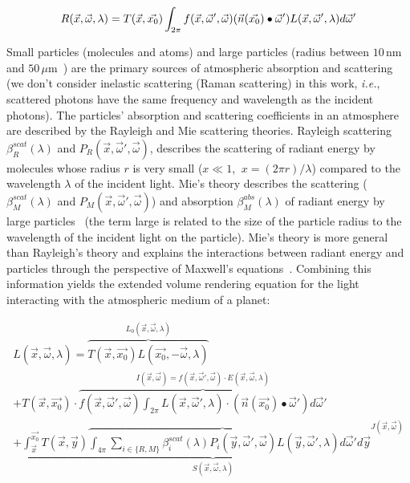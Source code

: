 \documentclass[journal]{vgtc}                %
\begin{document}
\begin{equation}\label{eq:reflected_light}
\small
R(\vec{x}, \vec{\omega}, \lambda) = T(\vec{x}, \vec{x_0}) \int_{2\pi}{ f(\vec{x}, \vec{\omega}', \vec{\omega})(\vec{n}(\vec{x_0}) \bullet  \vec{\omega}') L(\vec{x},\vec{\omega}', \lambda)d\vec{\omega}'}
\end{equation}

Small particles (molecules and atoms) and large particles (radius between $10\,\text{nm}$ and $50\,\mu \text{m}$~\cite{Thomas:2017}) are the primary sources of atmospheric absorption and scattering (we don't consider inelastic scattering (Raman scattering) in this work, \textit{i.e.}, scattered photons have the same frequency and wavelength as the incident photons). The particles' absorption and scattering coefficients in an atmosphere are described by the Rayleigh and Mie scattering theories. Rayleigh scattering~\cite{Rayleigh:1871} $\beta_R^{scat}(\lambda)$ and $P_R(\vec{x}, \vec{\omega}', \vec{\omega})$, describes the scattering of radiant energy by molecules whose radius $r$ is very small ($x \ll 1$, $\ x=(2\pi r)/\lambda$) compared to the wavelength $\lambda$ of the incident light. Mie's theory describes the scattering ($\beta_M^{scat}(\lambda)$ and $P_M(\vec{x}, \vec{\omega}', \vec{\omega})$) and absorption $\beta_M^{abs}(\lambda)$ of radiant energy by large particles~\cite{Hulst:1981, Mishchenko:2006} (the term large is related to the size of the particle radius to the wavelength of the incident light on the particle). Mie's theory is more general than Rayleigh's theory and explains the interactions between radiant energy and particles through the perspective of Maxwell's equations~\cite{Mishchenko:2002}. Combining this information yields the extended volume rendering equation for the light interacting with the atmospheric %
medium of a planet: 

\vspace*{-5mm}
{
\small
\begin{multline}\label{eq:ATM_VRE}
L(\vec{x},\vec{\omega}, \lambda) = \overbrace{ T(\vec{x}, \vec{x_0})L(\vec{x_0},-\vec{\omega}, \lambda) }^{L_0(\vec{x}, \vec{\omega}, \lambda)}\\
+ T(\vec{x}, \vec{x_0}) \cdot \overbrace{f(\vec{x}, \vec{\omega}', \vec{\omega}) \int_{2\pi}{L(\vec{x},\vec{\omega}', \lambda) \cdot (\vec{n}(\vec{x_0}) \bullet  \vec{\omega}') d\vec{\omega}'}}^{I(\vec{x}, \vec{\omega}) = f(\vec{x}, \vec{\omega}', \vec{\omega}) \cdot E(\vec{x}, \vec{\omega}, \lambda)}\\
+ \underbrace{\int_{\vec{x}}^{\vec{x_0}}{T(\vec{x}, \vec{y}) \overbrace{\int_{4\pi}{ \sum_{i \in \{R,M\}} \beta_{i}^{scat}(\lambda)P_i(\vec{y}, \vec{\omega}', \vec{\omega})L(\vec{y},\vec{\omega}', \lambda)d\vec{\omega}'}}d\vec{y}}^{J(\vec{x}, \vec{\omega})} }_{S(\vec{x}, \vec{\omega}, \lambda)}
\end{multline} 
}
\vspace*{-3mm}
\end{document}
